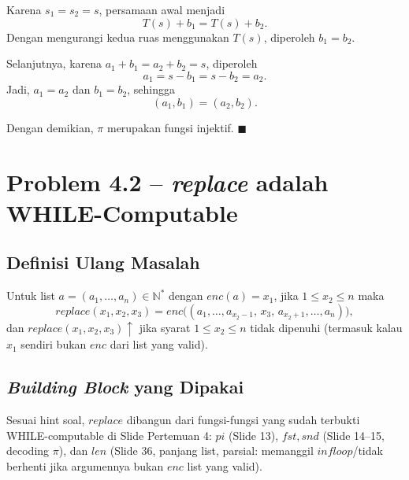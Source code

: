 \documentclass[12pt, a4paper, bahasa]{article}
\begin{document}
Karena $s_1=s_2=s$, persamaan awal menjadi
\[
T(s)+b_1=T(s)+b_2.
\]
Dengan mengurangi kedua ruas menggunakan $T(s)$,
diperoleh $b_1=b_2$.

Selanjutnya, karena $a_1+b_1=a_2+b_2=s$,
diperoleh
\[
a_1=s-b_1=s-b_2=a_2.
\]
Jadi, $a_1=a_2$ dan $b_1=b_2$, sehingga
\[
(a_1,b_1)=(a_2,b_2).
\]

Dengan demikian, $\pi$ merupakan fungsi injektif.
\hfill$\blacksquare$


\section{Problem 4.2 -- \textit{replace} adalah WHILE-Computable}

\subsection{Definisi Ulang Masalah}
Untuk list $a=(a_1,\dots,a_n)\in\mathbb{N}^*$ dengan $enc(a)=x_1$, jika
$1\leq x_2\leq n$ maka
$$replace(x_1,x_2,x_3)=enc\big((a_1,\dots,a_{x_2-1},\,x_3,\,a_{x_2+1},\dots,a_n)\big),$$
dan $replace(x_1,x_2,x_3)\uparrow$ jika syarat $1\leq x_2\leq n$ tidak
dipenuhi (termasuk kalau $x_1$ sendiri bukan $enc$ dari list yang valid).

\subsection{\textit{Building Block} yang Dipakai}
Sesuai hint soal, $replace$ dibangun dari fungsi-fungsi yang sudah terbukti
WHILE-computable di Slide Pertemuan 4: $pi$ (Slide 13), $fst,snd$ (Slide 14--15,
decoding $\pi$), dan $len$ (Slide 36, panjang list, parsial: memanggil
$infloop$/tidak berhenti jika argumennya bukan $enc$ list yang valid).
\end{document}
